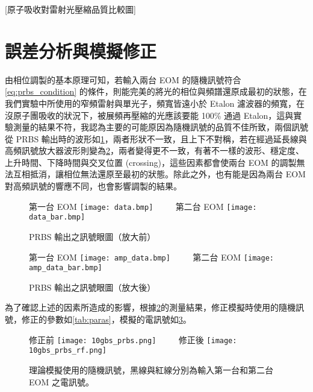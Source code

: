 \documentclass[class=NCU_thesis, crop=false]{standalone}
\begin{document}
[原子吸收對雷射光壓縮品質比較圖]

\section{誤差分析與模擬修正}

由相位調製的基本原理可知，若輸入兩台 EOM 的隨機訊號符合\cref{eq:prbs_condition} 的條件，則能完美的將光的相位與頻譜還原成最初的狀態，在我們實驗中所使用的窄頻雷射與單光子，頻寬皆遠小於 Etalon 濾波器的頻寬，在沒原子團吸收的狀況下，被展頻再壓縮的光應該要能 100\% 通過 Etalon，這與實驗測量的結果不符，我認為主要的可能原因為隨機訊號的品質不佳所致，兩個訊號從 PRBS 輸出時的波形如\cref{fig:prbs_eye_}，兩者形狀不一致，且上下不對稱，若在經過延長線與高頻訊號放大器波形則變為\cref{fig:amp_prbs_eye}，兩者變得更不一致，有著不一樣的波形、穩定度、上升時間、下降時間與交叉位置 (crossing)，這些因素都會使兩台 EOM 的調製無法互相抵消，讓相位無法還原至最初的狀態。除此之外，也有能是因為兩台 EOM 對高頻訊號的響應不同，也會影響調製的結果。

\begin{figure}[!hbt]
    \centering
    \subcaptionbox
        {第一台 EOM
        \label{fig:subfig_fig1}}
        {\texttt{[image: data.bmp]}}
    ~~~~
    \subcaptionbox
        {第二台 EOM
        \label{fig:subfig_fig2}}
        {\texttt{[image: data\_bar.bmp]}}
    \caption{PRBS 輸出之訊號眼圖（放大前）}
    \label{fig:prbs_eye_}
\end{figure}

\begin{figure}[!hbt]
    \centering
    \subcaptionbox
        {第一台 EOM
        \label{fig:subfig_fig1}}
        {\texttt{[image: amp\_data.bmp]}}
    ~~~~
    \subcaptionbox
        {第二台 EOM
        \label{fig:subfig_fig2}}
        {\texttt{[image: amp\_data\_bar.bmp]}}
    \caption{PRBS 輸出之訊號眼圖（放大後）}
    \label{fig:amp_prbs_eye}
\end{figure}

為了確認上述的因素所造成的影響，根據\cref{fig:amp_prbs_eye}的測量結果，修正模擬時使用的隨機訊號，修正的參數如\cref{tab:paras}，模擬的電訊號如\cref{fig:modify_or_not}。

\begin{figure}[!hbt]
    \centering
    \subcaptionbox
        {修正前
        \label{fig:subfig_fig1}}
        {\texttt{[image: 10gbs\_prbs.png]}}
    ~~~~
    \subcaptionbox
        {修正後
        \label{fig:subfig_fig2}}
        {\texttt{[image: 10gbs\_prbs\_rf.png]}}
    \caption[理論模擬使用的隨機訊號]{理論模擬使用的隨機訊號，黑線與紅線分別為輸入第一台和第二台 EOM 之電訊號。}
    \label{fig:modify_or_not}
\end{figure}
\end{document}

